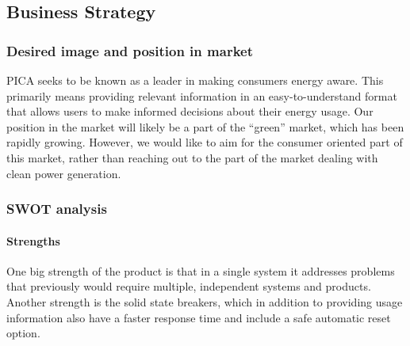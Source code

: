 \subsection{Business Strategy}
\subsubsection{Desired image and position in market}
PICA seeks to be known as a leader in making consumers energy aware. This primarily means providing relevant information in an easy-to-understand format that allows users to make informed decisions about their energy usage. Our position in the market will likely be a part of the ``green'' market, which has been rapidly growing. However, we would like to aim for the consumer oriented part of this market, rather than reaching out to the part of the market dealing with clean power generation.
\subsubsection{SWOT analysis}
\paragraph{Strengths}
One big strength of the product is that in a single system it addresses problems that previously would require multiple, independent systems and products. Another strength is the solid state breakers, which in addition to providing usage information also have a faster response time and include a safe automatic reset option.
